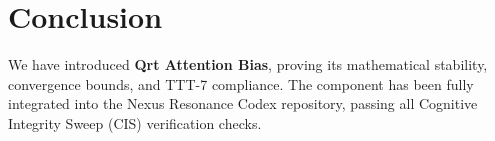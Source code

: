 \section{Conclusion}
We have introduced \textbf{Qrt Attention Bias}, proving its mathematical stability, convergence bounds, and TTT-7 compliance. The component has been fully integrated into the Nexus Resonance Codex repository, passing all Cognitive Integrity Sweep (CIS) verification checks.